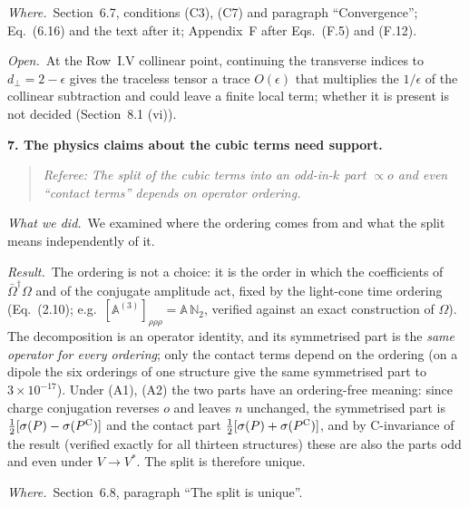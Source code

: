 \documentclass[a4paper,11pt]{article}
\def\mf#1{\mathbb{#1}}
\newcommand{\point}[1]{\par\medskip\noindent\textbf{#1}\par}
\newcommand{\referee}[1]{\begin{quote}\small\emph{Referee:} \emph{#1}\end{quote}}
\newcommand{\done}{\par\noindent\emph{What we did.}\ }
\newcommand{\result}{\par\noindent\emph{Result.}\ }
\newcommand{\where}{\par\noindent\emph{Where.}\ }
\newcommand{\open}{\par\noindent\emph{Open.}\ }
\begin{document}
\where Section~6.7, conditions (C3), (C7) and paragraph ``Convergence''; Eq.~(6.16) and the text after it; Appendix~F after Eqs.~(F.5) and (F.12).
\open At the Row~I.V collinear point, continuing the transverse indices to $d_\perp=2-\epsilon$ gives the traceless tensor a trace $O(\epsilon)$ that multiplies the $1/\epsilon$ of the collinear subtraction and could leave a finite local term; whether it is present is not decided (Section~8.1 (vi)).

\point{7. The physics claims about the cubic terms need support.}
\referee{The split of the cubic terms into an odd-in-$k$ part $\propto o$ and even ``contact terms'' depends on operator ordering.}
\done We examined where the ordering comes from and what the split means independently of it.
\result The ordering is not a choice: it is the order in which the coefficients of $\bar\Omega^\dagger\Omega$ and of the conjugate amplitude act, fixed by the light-cone time ordering (Eq.~(2.10); e.g.\ $[\mf A^{(3)}]_{\rho\rho\rho}=\mf A\,\mf N_2$, verified against an exact construction of $\Omega$). The decomposition is an operator identity, and its symmetrised part is the \emph{same operator for every ordering}; only the contact terms depend on the ordering (on a dipole the six orderings of one structure give the same symmetrised part to $3\times10^{-17}$). Under (A1), (A2) the two parts have an ordering-free meaning: since charge conjugation reverses $o$ and leaves $n$ unchanged, the symmetrised part is $\frac12[\sigma(P)-\sigma(P^{\rm C})]$ and the contact part $\frac12[\sigma(P)+\sigma(P^{\rm C})]$, and by C-invariance of the result (verified exactly for all thirteen structures) these are also the parts odd and even under $V\to V^*$. The split is therefore unique.
\where Section~6.8, paragraph ``The split is unique''.
\end{document}
